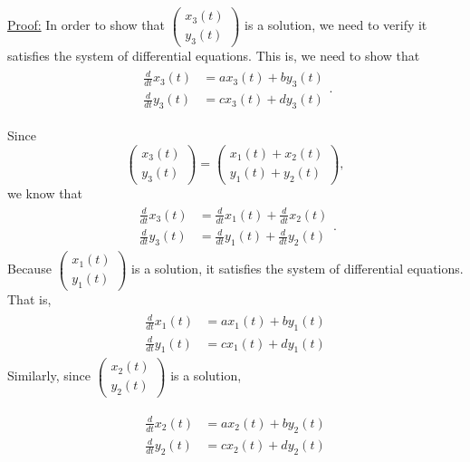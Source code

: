 \begin{enumerate}
\noindent\underline{Proof:}
In order to show that $\displaystyle \begin{pmatrix} x_3(t)\\y_3(t) \end{pmatrix}$  is a solution, we need to verify it satisfies the system of differential equations. This is, we need to show that  
\begin{align*}\begin{split}
\frac{d}{dt}x_3(t)&=ax_3(t)+by_3(t)\\ \frac{d}{dt}y_3(t)&= cx_3(t)+dy_3(t)
\end{split}.\end{align*}

Since   
\[ \begin{pmatrix}
x_3(t)\\y_3(t)\end{pmatrix}=\begin{pmatrix}
x_1(t)+x_2(t)\\y_1(t)+y_2(t)
\end{pmatrix},\] we know that   
\begin{align}\begin{split}
\frac{d}{dt}x_3(t)&=\frac{d}{dt}x_1(t)+\frac{d}{dt}x_2(t)\\ \frac{d}{dt}y_3(t)&= \frac{d}{dt}y_1(t)+\frac{d}{dt}y_2(t) 
\end{split}.\label{12HWeqn1}\end{align}
Because $\displaystyle \begin{pmatrix} x_1(t)\\y_1(t) \end{pmatrix}$   is a solution, it satisfies the system of differential equations. That is,    
\begin{align}\begin{split}
\frac{d}{dt}x_1(t)&=ax_1(t)+by_1(t)\\ \frac{d}{dt}y_1(t)&= cx_1(t)+dy_1(t) \label{12HWeqn2}
\end{split}\end{align}  
Similarly, since   $\displaystyle \begin{pmatrix} x_2(t)\\y_2(t) \end{pmatrix}$   is a solution,  
  
\begin{align}\begin{split}
\frac{d}{dt}x_2(t)&=ax_2(t)+by_2(t)\\ \frac{d}{dt}y_2(t)&= cx_2(t)+dy_2(t) \label{12HWeqn3}
\end{split}\end{align}  


\end{enumerate}
